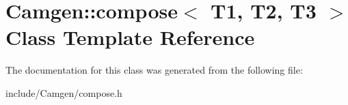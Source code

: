 \hypertarget{a00090}{}\section{Camgen\+:\+:compose$<$ T1, T2, T3 $>$ Class Template Reference}
\label{a00090}


The documentation for this class was generated from the following file\+:\begin{DoxyCompactItemize}
\item 
include/\+Camgen/compose.\+h\end{DoxyCompactItemize}
